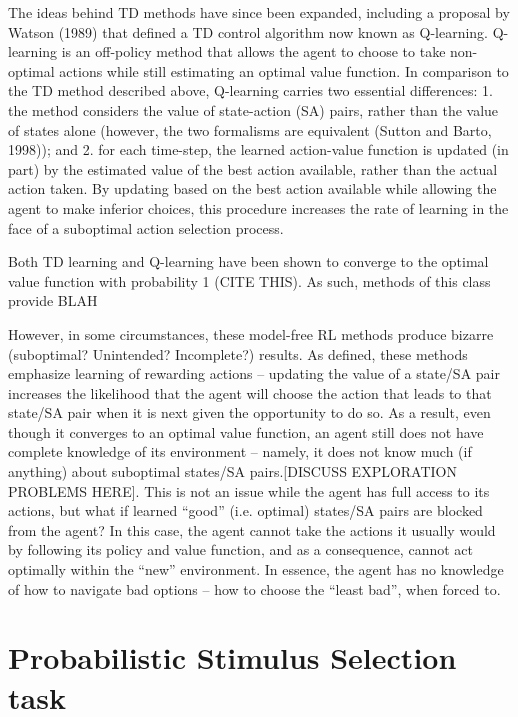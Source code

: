 \documentclass[11pt]{article} %
\begin{document}
The ideas behind TD methods have since been expanded, including a proposal by Watson (1989) that defined a TD control algorithm now known as Q-learning. Q-learning is an off-policy method that allows the agent to choose to take non-optimal actions while still estimating an optimal value function. In comparison to the TD method described above, Q-learning carries two essential differences: 1. the method considers the value of state-action (SA) pairs, rather than the value of states alone (however, the two formalisms are equivalent (Sutton and Barto, 1998)); and 2. for each time-step, the learned action-value function is updated (in part) by the estimated value of the best action available, rather than the actual action taken. By updating based on the best action available while allowing the agent to make inferior choices, this procedure increases the rate of learning in the face of a suboptimal action selection process.

Both TD learning and Q-learning have been shown to converge to the optimal value function with probability 1 (CITE THIS). As such, methods of this class provide BLAH

However, in some circumstances, these model-free RL methods produce bizarre (suboptimal? Unintended? Incomplete?) results. As defined, these methods emphasize learning of rewarding actions – updating the value of a state/SA pair increases the likelihood that the agent will choose the action that leads to that state/SA pair when it is next given the opportunity to do so. As a result, even though it converges to an optimal value function, an agent still does not have complete knowledge of its environment – namely, it does not know much (if anything) about suboptimal states/SA pairs.[DISCUSS EXPLORATION PROBLEMS HERE]. This is not an issue while the agent has full access to its actions, but what if learned “good” (i.e. optimal) states/SA pairs are blocked from the agent? In this case, the agent cannot take the actions it usually would by following its policy and value function, and as a consequence, cannot act optimally within the “new” environment. In essence, the agent has no knowledge of how to navigate bad options – how to choose the “least bad”, when forced to.

\section{Probabilistic Stimulus Selection task}
\label{gen_inst} %
\end{document}
